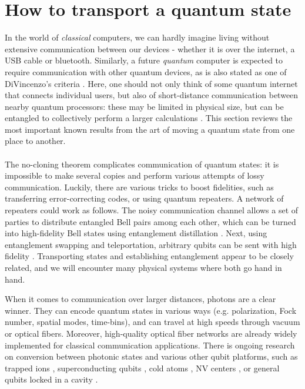 \section{How to transport a quantum state}
\label{sec:howtotransport}
In the world of \emph{classical} computers, we can hardly imagine living without extensive communication between our devices - whether it is over the internet, a USB cable or bluetooth. Similarly, a future \emph{quantum} computer is expected to require communication with other quantum devices, as is also stated as one of DiVincenzo's criteria \cite{DiVincenzo2000}. Here, one should not only think of some quantum internet that connects individual users, but also of short-distance communication between nearby quantum processors: these may be limited in physical size, but can be entangled to collectively perform a larger calculations \cite{Vandersypen2017,Brown2016}. This section reviews the most important known results from the art of moving a quantum state from one place to another. 

\paragraph{}
The no-cloning theorem complicates communication of quantum states: it is impossible to make several copies and perform various attempts of lossy communication. Luckily, there are various tricks to boost fidelities, such as transferring error-correcting codes, or using quantum repeaters. A network of repeaters could work as follows. The noisy communication channel allows a set of parties to distribute entangled Bell pairs among each other, which can be turned into high-fidelity Bell states using entanglement distillation \cite{Bennett1996,Bennett1996a,Kalb2017}. Next, using entanglement swapping and teleportation, arbitrary qubits can be sent with high fidelity \cite{Wehner2018}. Transporting states and establishing entanglement appear to be closely related, and we will encounter many physical systems where both go hand in hand.

When it comes to communication over larger distances, photons are a clear winner. They can encode quantum states in various ways (e.g. polarization, Fock number, spatial modes, time-bins), and can travel at high speeds through vacuum or optical fibers. Moreover, high-quality optical fiber networks are already widely implemented for classical communication applications. There is ongoing research on conversion between photonic states and various other qubit platforms, such as trapped ions \cite{Monroe2014}, superconducting qubits \cite{Soltani2017}, cold atoms \cite{Bechler2018,Tiarks2019}, NV centers \cite{Dreau2018}, or general qubits locked in a cavity \cite{Vogell2017}. 


